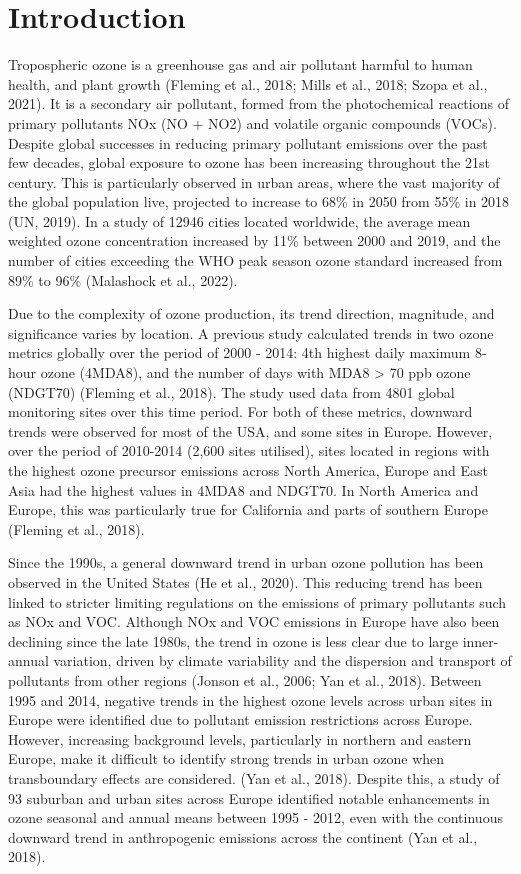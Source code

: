 \documentclass[journal abbreviation, manuscript]{copernicus}
\begin{document}
\section{Introduction}  %
Tropospheric ozone is a greenhouse gas and air pollutant harmful to human health, and plant growth (Fleming et al., 2018; Mills et al., 2018; Szopa et al., 2021). It is a secondary air pollutant, formed from the photochemical reactions of primary pollutants NOx (NO + NO2) and volatile organic compounds (VOCs). Despite global successes in reducing primary pollutant emissions over the past few decades, global exposure to ozone has been increasing throughout the 21st century. This is particularly observed in urban areas, where the vast majority of the global population live, projected to increase to 68\% in 2050 from 55\% in 2018 (UN, 2019). In a study of 12946 cities located worldwide, the average mean weighted ozone concentration increased by 11\% between 2000 and 2019, and the number of cities exceeding the WHO peak season ozone standard increased from 89\% to 96\% (Malashock et al., 2022).

Due to the complexity of ozone production, its trend direction, magnitude, and significance varies by location. A previous study calculated trends in two ozone metrics globally over the period of 2000 - 2014: 4th highest daily maximum 8-hour ozone (4MDA8), and the number of days with MDA8 > 70 ppb ozone (NDGT70) (Fleming et al., 2018). The study used data from 4801 global monitoring sites over this time period. For both of these metrics, downward trends were observed for most of the USA, and some sites in Europe. However, over the period of 2010-2014 (2,600 sites utilised), sites located in regions with the highest ozone precursor emissions across North America, Europe and East Asia had the highest values in 4MDA8 and NDGT70. In North America and Europe, this was particularly true for California and parts of southern Europe (Fleming et al., 2018).

Since the 1990s, a general downward trend in urban ozone pollution has been observed in the United States (He et al., 2020). This reducing trend has been linked to stricter limiting regulations on the emissions of primary pollutants such as NOx and VOC. Although NOx and VOC emissions in Europe have also been declining since the late 1980s, the trend in ozone is less clear due to large inner-annual variation, driven by climate variability and the dispersion and transport of pollutants from other regions (Jonson et al., 2006; Yan et al., 2018). Between 1995 and 2014, negative trends in the highest ozone levels across urban sites in Europe were identified due to pollutant emission restrictions across Europe. However, increasing background levels, particularly in northern and eastern Europe, make it difficult to identify strong trends in urban ozone when transboundary effects are considered. (Yan et al., 2018). Despite this, a study of 93 suburban and urban sites across Europe identified notable enhancements in ozone seasonal and annual means between 1995 - 2012, even with the continuous downward trend in anthropogenic emissions across the continent (Yan et al., 2018).
\end{document}
